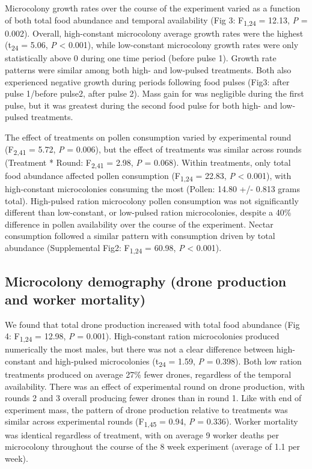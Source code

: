 \documentclass[11pt,]{article}
\begin{document}
Microcolony growth rates over the course of the experiment varied as a
function of both total food abundance and temporal availability (Fig 3:
F\textsubscript{1,24} = 12.13, \emph{P} = 0.002). Overall, high-constant
microcolony average growth rates were the highest (t\textsubscript{24} =
5.06, \emph{P} \textless{} 0.001), while low-constant microcolony growth
rates were only statistically above 0 during one time period (before
pulse 1). Growth rate patterns were similar among both high- and
low-pulsed treatments. Both also experienced negative growth during
periods following food pulses (Fig3: after pulse 1/before pulse2, after
pulse 2). Mass gain for was negligible during the first pulse, but it
was greatest during the second food pulse for both high- and low-pulsed
treatments.

The effect of treatments on pollen consumption varied by experimental
round (F\textsubscript{2,41} = 5.72, \emph{P} = 0.006), but the effect
of treatments was similar across rounds (Treatment * Round:
F\textsubscript{2,41} = 2.98, \emph{P} = 0.068). Within treatments, only
total food abundance affected pollen consumption (F\textsubscript{1,24}
= 22.83, \emph{P} \textless{} 0.001), with high-constant microcolonies
consuming the most (Pollen: 14.80 +/- 0.813 grams total). High-pulsed
ration microcolony pollen consumption was not significantly different
than low-constant, or low-pulsed ration microcolonies, despite a 40\%
difference in pollen availability over the course of the experiment.
Nectar consumption followed a similar pattern with consumption driven by
total abundance (Supplemental Fig2: F\textsubscript{1,24} = 60.98,
\emph{P} \textless{} 0.001).

\hypertarget{microcolony-demography-drone-production-and-worker-mortality}{%
\subsection{Microcolony demography (drone production and worker
mortality)}\label{microcolony-demography-drone-production-and-worker-mortality}}

We found that total drone production increased with total food abundance
(Fig 4: F\textsubscript{1,24} = 12.98, \emph{P} = 0.001). High-constant
ration microcolonies produced numerically the most males, but there was
not a clear difference between high-constant and high-pulsed
microcolonies (t\textsubscript{24} = 1.59, \emph{P} = 0.398). Both low
ration treatments produced on average 27\% fewer drones, regardless of
the temporal availability. There was an effect of experimental round on
drone production, with rounds 2 and 3 overall producing fewer drones
than in round 1. Like with end of experiment mass, the pattern of drone
production relative to treatments was similar across experimental rounds
(F\textsubscript{1,45} = 0.94, \emph{P} = 0.336). Worker mortality was
identical regardless of treatment, with on average 9 worker deaths per
microcolony throughout the course of the 8 week experiment (average of
1.1 per week).
\end{document}
